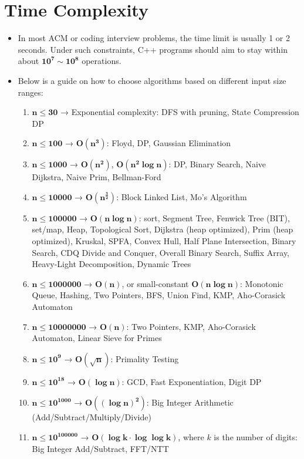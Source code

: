 \section{Time Complexity}
\begin{itemize}
  \item In most ACM or coding interview problems, the time limit is usually 1 or 2 seconds. Under such constraints, C++ programs should aim to stay within about $\mathbf{10^7 \sim 10^8}$ operations.
  
  \item Below is a guide on how to choose algorithms based on different input size ranges:

  \begin{enumerate}
  \item $\mathbf{n \leq 30}$ → Exponential complexity: DFS with pruning, State Compression DP
  \item $\mathbf{n \leq 100}$ → $\mathbf{O(n^3)}$: Floyd, DP, Gaussian Elimination
  \item $\mathbf{n \leq 1000}$ → $\mathbf{O(n^2)}$, $\mathbf{O(n^2 \log n)}$: DP, Binary Search, Naive Dijkstra, Naive Prim, Bellman-Ford
  \item $\mathbf{n \leq 10000}$ → $\mathbf{O(n^{\frac{3}{2}})}$: Block Linked List, Mo's Algorithm
  \item $\mathbf{n \leq 100000}$ → $\mathbf{O(n \log n)}$: sort, Segment Tree, Fenwick Tree (BIT), set/map, Heap, Topological Sort, Dijkstra (heap optimized), Prim (heap optimized), Kruskal, SPFA, Convex Hull, Half Plane Intersection, Binary Search, CDQ Divide and Conquer, Overall Binary Search, Suffix Array, Heavy-Light Decomposition, Dynamic Trees
  \item $\mathbf{n \leq 1000000}$ → $\mathbf{O(n)}$, or small-constant $\mathbf{O(n \log n)}$: Monotonic Queue, Hashing, Two Pointers, BFS, Union Find, KMP, Aho-Corasick Automaton
  \item $\mathbf{n \leq 10000000}$ → $\mathbf{O(n)}$: Two Pointers, KMP, Aho-Corasick Automaton, Linear Sieve for Primes
  \item $\mathbf{n \leq 10^9}$ → $\mathbf{O(\sqrt{n})}$: Primality Testing
  \item $\mathbf{n \leq 10^{18}}$ → $\mathbf{O(\log n)}$: GCD, Fast Exponentiation, Digit DP
  \item $\mathbf{n \leq 10^{1000}}$ → $\mathbf{O((\log n)^2)}$: Big Integer Arithmetic (Add/Subtract/Multiply/Divide)
  \item $\mathbf{n \leq 10^{100000}}$ → $\mathbf{O(\log k \cdot \log \log k)}$, where $k$ is the number of digits: Big Integer Add/Subtract, FFT/NTT
  \end{enumerate}
\end{itemize}
\newpage

